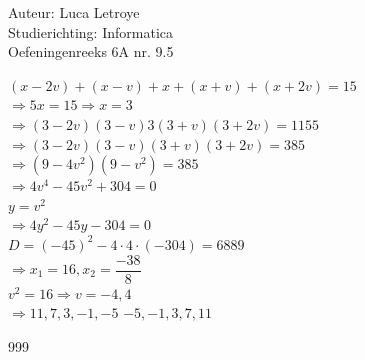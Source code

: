 \documentclass[a4paper]{article}
\begin{document}
  
\noindent \large Auteur: Luca Letroye \\
\noindent \large Studierichting: Informatica\\
\noindent \large Oefeningenreeks 6A nr. 9.5

\medskip
\normalsize

$(x-2v)+(x-v)+x+(x+v)+(x+2v) = 15$\\

$\Rightarrow 5x = 15 \Rightarrow x =3$\\

$\Rightarrow (3-2v)(3-v)3(3+v)(3+2v) = 1155$\\

$\Rightarrow (3-2v)(3-v)(3+v)(3+2v) = 385$\\

$\Rightarrow (9-4v^2)(9-v^2) = 385$\\

$\Rightarrow  4v^4-45v^2+304 = 0 $\\

$y = v^2$\\

$\Rightarrow 4y^2 -45y-304 = 0$\\

$D = (-45)^2-4\cdot4\cdot (-304) = 6889$\\

$\Rightarrow x_1 = 16, x_2 = \dfrac{-38}{8}$\\

$v^2 = 16 \Rightarrow v = -4, 4$\\

$\Rightarrow 11,7,3,-1,-5$  $-5,-1,3,7,11$\\


\begin{thebibliography}{999}
\end{thebibliography}
\end{document}
